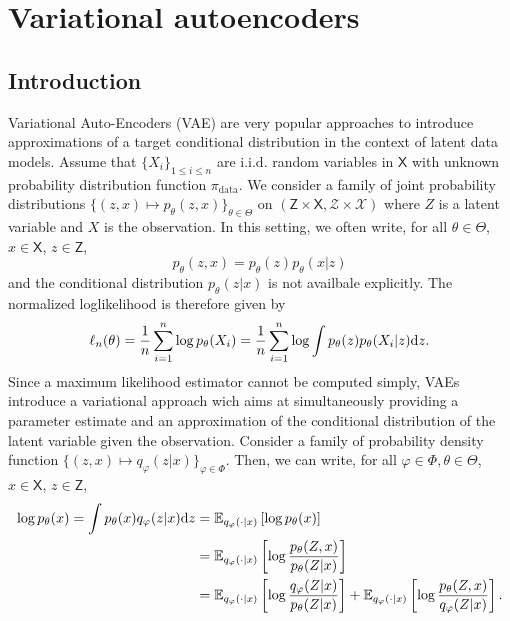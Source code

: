 \documentclass[english,graybox,envcountchap,envcountsame,sectrefs,shortlabels]{svmono}
\theoremstyle{style}
\renewenvironment{keywords}{\textit{\bf Keywords: } \sffamily }{}
\newcommand{\eqsp}{}
\begin{document}
\chapter{Variational autoencoders}
\minitoc
\section{Introduction}
Variational Auto-Encoders (VAE) are very popular approaches to introduce approximations of a target conditional distribution in the context of latent data models. Assume that $\{X_i\}_{1\leqslant i\leqslant n}$ are i.i.d. random variables in $\mathsf{X}$ with unknown probability distribution function $\pi_{\mathrm{data}}$. We consider a family of joint probability distributions $\{(z,x) \mapsto  p_{\theta}(z,x)\}_{\theta\in\Theta}$ on $(\mathsf{Z}\times \mathsf{X}, \mathcal{Z}\times \mathcal{X})$ where $Z$ is a latent variable and $X$ is the observation. In this setting, we often write, for all $\theta\in\Theta$, $x\in\mathsf{X}$, $z\in\mathsf{Z}$,
$$
p_{\theta}(z,x) = p_{\theta}(z)p_{\theta}(x|z)
$$
and the conditional distribution $p_{\theta}(z|x)$ is not availbale explicitly. The normalized loglikelihood is therefore given by
$$
\ell_n(\theta) = \frac{1}{n}\sum_{i=1}^n \log p_{\theta}(X_i) = \frac{1}{n}\sum_{i=1}^n \log \int p_{\theta}(z)p_{\theta}(X_i|z)\rmd z\eqsp.
$$
Since a maximum likelihood estimator cannot be computed simply, VAEs introduce a variational approach wich aims at simultaneously providing a parameter estimate  and an approximation of the conditional distribution of the latent variable given the observation.  Consider a family of probability density function $\{(z,x) \mapsto q_{\varphi}(z|x)\}_{\varphi\in\Phi}$. Then, we can write, for all $\varphi\in\Phi,\theta\in\Theta$, $x\in\mathsf{X}$, $z\in\mathsf{Z}$,
\begin{align*}
\log p_\theta(x) = \int p_\theta(x) q_{\varphi}(z|x) \mathrm{d} z &= \mathbb{E}_{q_{\varphi}(\cdot|x)}\left[\log p_\theta(x)\right] \\
&= \mathbb{E}_{q_{\varphi}(\cdot|x)}\left[\log \frac{p_\theta(Z,x)}{p_\theta(Z|x)}\right] \\
&= \mathbb{E}_{q_{\varphi}(\cdot|x)}\left[\log \frac{q_{\varphi}(Z|x)}{p_\theta(Z|x)}\right]  + \mathbb{E}_{q_{\varphi}(\cdot|x)}\left[\log \frac{p_\theta(Z,x)}{q_{\varphi}(Z|x)}\right] .
\end{align*}
\end{document}

